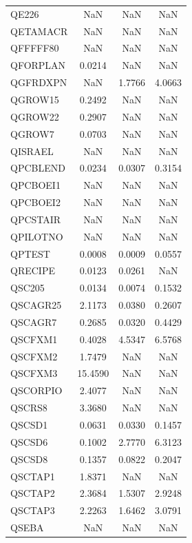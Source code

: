 \begin{longtable}{lccc}
QE226    &      NaN &      NaN &      NaN \\
QETAMACR &      NaN &      NaN &      NaN \\
QFFFFF80 &      NaN &      NaN &      NaN \\
QFORPLAN &   0.0214 &      NaN &      NaN \\
QGFRDXPN &      NaN &   1.7766 &   4.0663 \\
QGROW15  &   0.2492 &      NaN &      NaN \\
QGROW22  &   0.2907 &      NaN &      NaN \\
QGROW7   &   0.0703 &      NaN &      NaN \\
QISRAEL  &      NaN &      NaN &      NaN \\
QPCBLEND &   0.0234 &   0.0307 &   0.3154 \\
QPCBOEI1 &      NaN &      NaN &      NaN \\
QPCBOEI2 &      NaN &      NaN &      NaN \\
QPCSTAIR &      NaN &      NaN &      NaN \\
QPILOTNO &      NaN &      NaN &      NaN \\
QPTEST   &   0.0008 &   0.0009 &   0.0557 \\
QRECIPE  &   0.0123 &   0.0261 &      NaN \\
QSC205   &   0.0134 &   0.0074 &   0.1532 \\
QSCAGR25 &   2.1173 &   0.0380 &   0.2607 \\
QSCAGR7  &   0.2685 &   0.0320 &   0.4429 \\
QSCFXM1  &   0.4028 &   4.5347 &   6.5768 \\
QSCFXM2  &   1.7479 &      NaN &      NaN \\
QSCFXM3  &  15.4590 &      NaN &      NaN \\
QSCORPIO &   2.4077 &      NaN &      NaN \\
QSCRS8   &   3.3680 &      NaN &      NaN \\
QSCSD1   &   0.0631 &   0.0330 &   0.1457 \\
QSCSD6   &   0.1002 &   2.7770 &   6.3123 \\
QSCSD8   &   0.1357 &   0.0822 &   0.2047 \\
QSCTAP1  &   1.8371 &      NaN &      NaN \\
QSCTAP2  &   2.3684 &   1.5307 &   2.9248 \\
QSCTAP3  &   2.2263 &   1.6462 &   3.0791 \\
QSEBA    &      NaN &      NaN &      NaN \\

\end{longtable}
